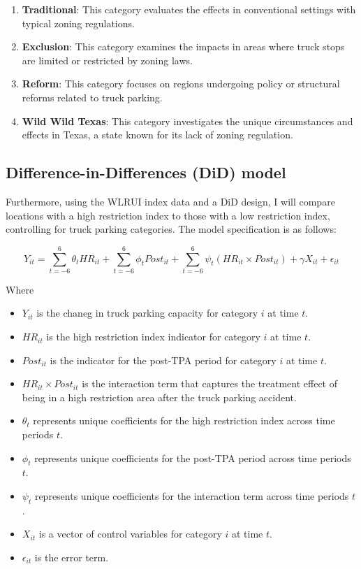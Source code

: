 \documentclass[
  12pt]{article}
\begin{document}
\begin{enumerate}
\def\labelenumi{\arabic{enumi}.}
\item
  \textbf{Traditional}: This category evaluates the effects in
  conventional settings with typical zoning regulations.
\item
  \textbf{Exclusion}: This category examines the impacts in areas where
  truck stops are limited or restricted by zoning laws.
\item
  \textbf{Reform}: This category focuses on regions undergoing policy or
  structural reforms related to truck parking.
\item
  \textbf{Wild Wild Texas}: This category investigates the unique
  circumstances and effects in Texas, a state known for its lack of
  zoning regulation.
\end{enumerate}

\subsection{Difference-in-Differences (DiD)
model}\label{difference-in-differences-did-model}

Furthermore, using the WLRUI index data and a DiD design, I will compare
locations with a high restriction index to those with a low restriction
index, controlling for truck parking categories. The model specification
is as follows:

\[
Y_{it} = \sum_{t=-6}^{6} \theta_t HR_{it} + \sum_{t=-6}^{6} \phi_t Post_{it} + \sum_{t=-6}^{6} \psi_t (HR_{it} \times Post_{it}) + \gamma X_{it} + \epsilon_{it}
\]

Where

\begin{itemize}
\item
  \(Y_{it}\) is the chaneg in truck parking capacity for category \(i\)
  at time \(t\).
\item
  \(HR_{it}\) is the high restriction index indicator for category \(i\)
  at time \(t\).
\item
  \(Post_{it}\) is the indicator for the post-TPA period for category
  \(i\) at time \(t\).
\item
  \(HR_{it} \times Post_{it}\) is the interaction term that captures the
  treatment effect of being in a high restriction area after the truck
  parking accident.
\item
  \(\theta_t\) represents unique coefficients for the high restriction
  index across time periods \(t\).
\item
  \(\phi_t\) represents unique coefficients for the post-TPA period
  across time periods \(t\).
\item
  \(\psi_t\) represents unique coefficients for the interaction term
  across time periods \(t\).
\item
  \(X_{it}\) is a vector of control variables for category \(i\) at time
  \(t\).
\item
  \(\epsilon_{it}\) is the error term.
\end{itemize}
\end{document}
